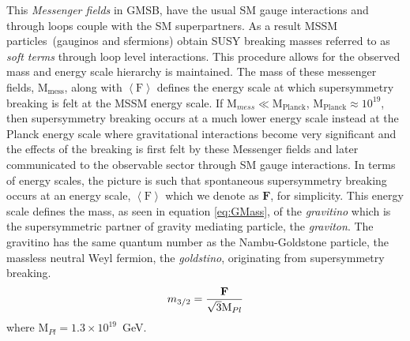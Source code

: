 {This \textit{Messenger fields} in GMSB, have the usual SM gauge interactions  and through loops couple with the SM superpartners. As a result MSSM particles~(gauginos and sfermions) obtain SUSY breaking masses referred to as \textit{soft terms} through loop level interactions. This procedure allows for the observed mass and energy scale hierarchy is maintained. The mass of these messenger fields, $\displaystyle{\mathrm{M}_{\mbox{mess}}}$, along with $\left\langle\mathrm{F}\right\rangle$  defines the energy scale at which supersymmetry breaking is felt at the MSSM energy scale. If $\displaystyle{\mathrm{M}_{mess} \ll \mathrm{M}_{\mbox{Planck}}}$, $\mathrm{M}_{\mbox{Planck}} \approx 10^{19}$\GeV, then supersymmetry breaking occurs at a much lower energy scale instead at the Planck energy scale where gravitational interactions become very significant and the effects of the breaking is first felt by these Messenger fields and later communicated to the observable sector through SM gauge interactions.
In terms of energy scales, the picture is such that spontaneous supersymmetry breaking occurs at an energy scale, $\left\langle\mathrm{F}\right\rangle$ which we denote as $\mathbf{F}$, for simplicity. This energy scale defines the mass, as seen in equation \ref{eq:GMass}, of the \textit{gravitino} which is the supersymmetric partner of gravity mediating particle, the \textit{graviton}. The gravitino has the same quantum number as the Nambu-Goldstone particle, the massless neutral Weyl fermion, the \textit{goldstino}, originating from supersymmetry breaking. 
\begin{equation}{\label{eq:GMass}}
 m_{3/2} = \frac{\mathbf{F}}{{\sqrt{3}\mathrm{M}_{Pl}}}
\end{equation}
where $\displaystyle{\mathrm{M}_{Pl} = 1.3 \times 10^{19}}$~GeV.

}
